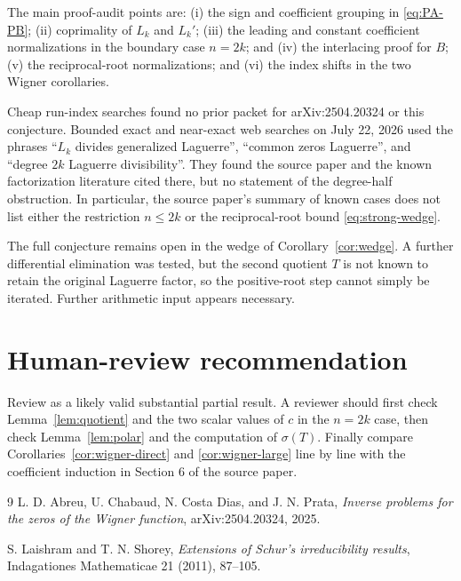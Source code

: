 \documentclass[11pt]{article}
\theoremstyle{remark}
\begin{document}
The main proof-audit points are: (i) the sign and coefficient grouping in
\eqref{eq:PA-PB}; (ii) coprimality of $L_k$ and $L_k'$; (iii) the leading and
constant coefficient normalizations in the boundary case $n=2k$; and
(iv) the interlacing proof for $B$; (v) the reciprocal-root normalizations;
and (vi) the index shifts in the two Wigner corollaries.

Cheap run-index searches found no prior packet for arXiv:2504.20324 or this
conjecture.  Bounded exact and near-exact web searches on July 22, 2026 used
the phrases ``$L_k$ divides generalized Laguerre'', ``common zeros Laguerre'',
and ``degree $2k$ Laguerre divisibility''.  They found the source paper and
the known factorization literature cited there, but no statement of the
degree-half obstruction.  In particular, the source paper's summary of known
cases does not list either the restriction $n\leq2k$ or the reciprocal-root
bound \eqref{eq:strong-wedge}.

The full conjecture remains open in the wedge of
Corollary~\ref{cor:wedge}.  A further differential elimination was tested,
but the second quotient $T$ is not known to retain the original Laguerre
factor, so the positive-root step cannot simply be iterated.  Further
arithmetic input appears necessary.

\section{Human-review recommendation}

Review as a likely valid substantial partial result.  A reviewer should first
check Lemma~\ref{lem:quotient} and the two scalar values of $c$ in the
$n=2k$ case, then check Lemma~\ref{lem:polar} and the computation of
$\sigma(T)$.  Finally compare Corollaries~\ref{cor:wigner-direct} and
\ref{cor:wigner-large} line by line with the coefficient induction in
Section 6 of the source paper.

\begin{thebibliography}{9}
L. D. Abreu, U. Chabaud, N. Costa Dias, and J. N. Prata,
\emph{Inverse problems for the zeros of the Wigner function},
arXiv:2504.20324, 2025.

S. Laishram and T. N. Shorey,
\emph{Extensions of Schur's irreducibility results},
Indagationes Mathematicae 21 (2011), 87--105.
\end{thebibliography}
\end{document}
